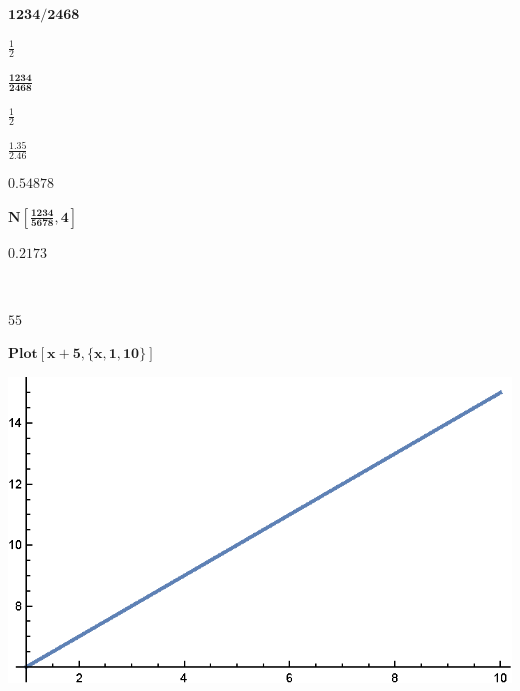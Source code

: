 \documentclass{article}
\begin{document}
\begin{doublespace}
\noindent\(\pmb{1234/2468}\)
\end{doublespace}

\begin{doublespace}
\noindent\(\frac{1}{2}\)
\end{doublespace}

\begin{doublespace}
\noindent\(\pmb{\frac{1234}{2468}}\)
\end{doublespace}

\begin{doublespace}
\noindent\(\frac{1}{2}\)
\end{doublespace}

\begin{doublespace}
\noindent\(\pmb{\frac{1.35}{2.46}}\)
\end{doublespace}

\begin{doublespace}
\noindent\(0.54878\)
\end{doublespace}

\begin{doublespace}
\noindent\(\pmb{N\left[\frac{1234}{5678},4\right]}\)
\end{doublespace}

\begin{doublespace}
\noindent\(0.2173\)
\end{doublespace}

\(\)

\begin{doublespace}
\noindent\(55\)
\end{doublespace}

\begin{doublespace}
\noindent\(\pmb{\text{Plot}[x+5,\{x, 1,10\}]}\)
\end{doublespace}

\includegraphics{WLG_gr15.eps}
\end{document}
